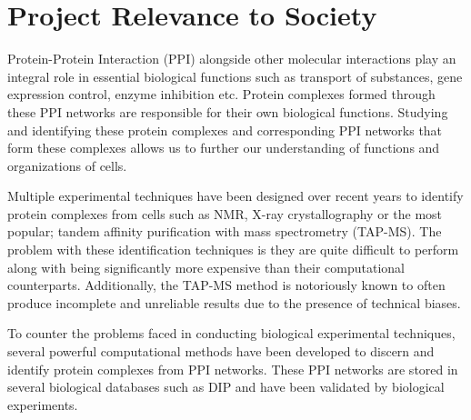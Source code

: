 \documentclass[11pt]{article}
\begin{document}

    
    
    
    
    
\section{Project Relevance to Society}
\label{lblPRS}
Protein-Protein Interaction (PPI) alongside other
molecular interactions play an integral role in
essential biological functions such as transport
of substances, gene expression control, enzyme
inhibition etc. Protein complexes formed through
these PPI networks are responsible for their own
biological functions. Studying and identifying
these protein complexes and corresponding PPI
networks that form these complexes allows us to
further our understanding of functions and
organizations of cells. 

Multiple experimental techniques have been
designed over recent years to identify protein complexes from cells such as NMR, X-ray crystallography or the most popular; tandem
affinity purification with mass
spectrometry (TAP-MS). The problem with these
identification techniques is they are quite
difficult to perform along with being
significantly more expensive than their
computational counterparts. Additionally, the
TAP-MS method is notoriously known to often
produce incomplete and unreliable results due to
the presence of technical biases.

To counter the problems faced in conducting
biological experimental techniques, several
powerful computational methods have been
developed to discern and identify protein
complexes from PPI networks. These PPI networks
are stored in several biological databases such as DIP and have been validated by biological experiments.
\end{document}
